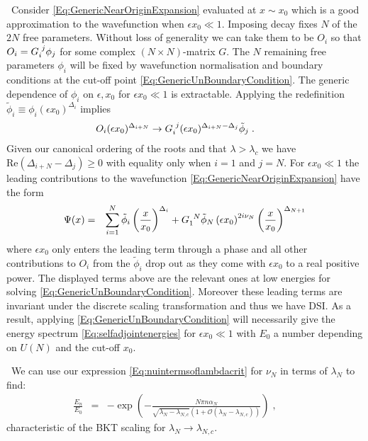 \documentclass[aps,prl,reprint,preprintnumbers]{revtex4-1}
\renewcommand{\Re}{\mathrm{Re}}
\begin{document}
{\ Consider \eqref{Eq:GenericNearOriginExpansion} evaluated at $x \sim x_{0}$ which is a good approximation to the wavefunction when $\epsilon x_{0} \ll 1$. Imposing decay fixes $N$ of the $2N$ free parameters. Without loss of generality we can take them to be $O_{i}$ so that $O_{i}=G\indices{_{i}^{j}} \phi_{j}$ for some complex $(N\times N)$-matrix $G$. The $N$ remaining free parameters $\phi_{i}$ will be fixed by wavefunction normalisation and boundary conditions at the cut-off point \eqref{Eq:GenericUnBoundaryCondition}. The generic dependence of $\phi_i$ on $\epsilon, x_0$ for $\epsilon x_0 \ll 1$ is extractable. Applying the redefinition $\tilde{\phi}_{i} \equiv \phi_{i} (\epsilon x_0)^{\Delta_{i}}$ implies 
  \begin{eqnarray}
   O_{i} (\epsilon x_0)^{\Delta_{i+N}} \rightarrow G\indices{_{i}^{j}} (\epsilon x_0)^{\Delta_{i+N}-\Delta_{j}}  \tilde{\phi}_{j} \; . \qquad
  \end{eqnarray} 
Given our canonical ordering of the roots and that $\lambda>\lambda_{c}$ we have $\Re(\Delta_{i+N}-\Delta_{j}) \geq 0$ with equality only when $i=1$ and $j=N$. For $\epsilon x_0 \ll 1$ the leading contributions to the wavefunction \eqref{Eq:GenericNearOriginExpansion} have the form 
  \begin{eqnarray}
   \label{Eq:SmallEnergyExpansion}
    \Psi(x) &=& \sum_{i=1}^{N} \tilde{\phi}_{i} \left(\frac{x}{x_0}\right)^{\Delta_{i}}
		+ G\indices{_{1}^{N}} \tilde{\phi}_{N} \left( \epsilon x_{0} \right)^{2i\nu_{N}} \left(\frac{x}{x_{0}}\right)^{\Delta_{N+1}} \nonumber
  \end{eqnarray}
where $\epsilon x_0$ only enters the leading term through a phase and all other contributions to $O_{i}$ from the $\tilde{\phi}_{i}$ drop out as they come with $\epsilon x_0$ to a real positive power. The displayed terms above are the relevant ones at low energies for solving \eqref{Eq:GenericUnBoundaryCondition}. Moreover these leading terms are invariant under the discrete scaling transformation and thus we have DSI. As a result, applying \eqref{Eq:GenericUnBoundaryCondition} will necessarily give the energy spectrum \eqref{Eq:selfadjointenergies} for $\epsilon x_{0} \ll 1$ with $E_{0}$ a number depending on $U(N)$ and the cut-off $x_{0}$.}

{\ We can use our expression \eqref{Eq:nuintermsoflambdacrit} for $\nu_{N}$ in terms of $\lambda_{N}$ to find:
  \begin{eqnarray}
    \frac{E_{n}}{E_{0}} &=& - \exp \left( - \frac{N \pi n \alpha_{N}}{ \sqrt{\lambda_{N} - \lambda_{N,c}} \left( 1 + \mathcal{O}(\lambda_{N}-\lambda_{N,c}) \right)  } \right) \; , \qquad
    \label{Eq:BKT scaling}
  \end{eqnarray}
characteristic of the BKT scaling for $\lambda_{N} \rightarrow \lambda_{N,c}$.}
\end{document}

